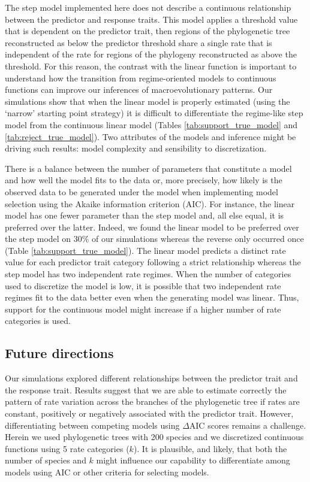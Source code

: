 The step model implemented here does not describe a continuous relationship between the predictor and response traits. This model applies a threshold value that is dependent on the predictor trait, then regions of the phylogenetic tree reconstructed as below the predictor threshold share a single rate that is independent of the rate for regions of the phylogeny reconstructed as above the threshold. For this reason, the contrast with the linear function is important to understand how the transition from regime-oriented models to continuous functions can improve our inferences of macroevolutionary patterns. Our simulations show that when the linear model is properly estimated (using the `narrow' starting point strategy) it is difficult to differentiate the regime-like step model from the continuous linear model (Tables \ref{tab:support_true_model} and \ref{tab:reject_true_model}). Two attributes of the models and inference might be driving such results: model complexity and sensibility to discretization.

There is a balance between the number of parameters that constitute a model and how well the model fits to the data or, more precisely, how likely is the observed data to be generated under the model when implementing model selection using the Akaike information criterion (AIC). For instance, the linear model has one fewer parameter than the step model and, all else equal, it is preferred over the latter. Indeed, we found the linear model to be preferred over the step model on 30\% of our simulations whereas the reverse only occurred once (Table \ref{tab:support_true_model}). The linear model predicts a distinct rate value for each predictor trait category following a strict relationship whereas the step model has two independent rate regimes. When the number of categories used to discretize the model is low, it is possible that two independent rate regimes fit to the data better even when the generating model was linear. Thus, support for the continuous model might increase if a higher number of rate categories is used.

\subsection{Future directions}

Our simulations explored different relationships between the predictor trait and the response trait. Results suggest that we are able to estimate correctly the pattern of rate variation across the branches of the phylogenetic tree if rates are constant, positively or negatively associated with the predictor trait. However, differentiating between competing models using $\Delta$AIC scores remains a challenge. Herein we used phylogenetic trees with 200 species and we discretized continuous functions using 5 rate categories ($\mathit{k}$). It is plausible, and likely, that both the number of species and $\mathit{k}$ might influence our capability to differentiate among models using AIC or other criteria for selecting models. 

